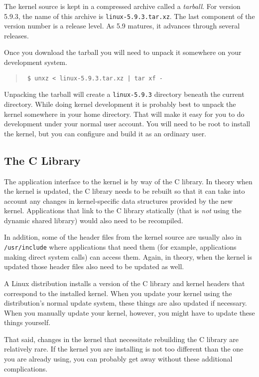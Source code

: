 \documentclass{article}
\newcommand{\filename}[1]{\texttt{#1}}
\newcommand{\newterm}[1]{\textit{#1}}
\newenvironment{commands}
  {\begin{quote} \tt}
  {\end{quote}}
\begin{document}
The kernel source is kept in a compressed archive called a \newterm{tarball}. For version
5.9.3, the name of this archive is \filename{linux-5.9.3.tar.xz}. The last component of the
version number is a release level. As 5.9 matures, it advances through several releases.

Once you download the tarball you will need to unpack it somewhere on your development system.

\begin{commands}
\$ unxz < linux-5.9.3.tar.xz | tar xf -
\end{commands}

Unpacking the tarball will create a \filename{linux-5.9.3} directory beneath the current
directory. While doing kernel development it is probably best to unpack the kernel somewhere in
your home directory. That will make it easy for you to do development under your normal user
account. You will need to be root to install the kernel, but you can configure and build it as
an ordinary user.

\subsection{The C Library }

The application interface to the kernel is by way of the C library. In theory when the kernel is
updated, the C library needs to be rebuilt so that it can take into account any changes in
kernel-specific data structures provided by the new kernel. Applications that link to the C
library statically (that is \emph{not} using the dynamic shared library) would also need to be
recompiled.

In addition, some of the header files from the kernel source are usually also in
\filename{/usr/include} where applications that need them (for example, applications making
direct system calls) can access them. Again, in theory, when the kernel is updated those header
files also need to be updated as well.

A Linux distribution installs a version of the C library and kernel headers that correspond to
the installed kernel. When you update your kernel using the distribution's normal update system,
these things are also updated if necessary. When you manually update your kernel, however, you
might have to update these things yourself.

That said, changes in the kernel that necessitate rebuilding the C library are relatively rare.
If the kernel you are installing is not too different than the one you are already using, you
can probably get away without these additional complications.
\end{document}
